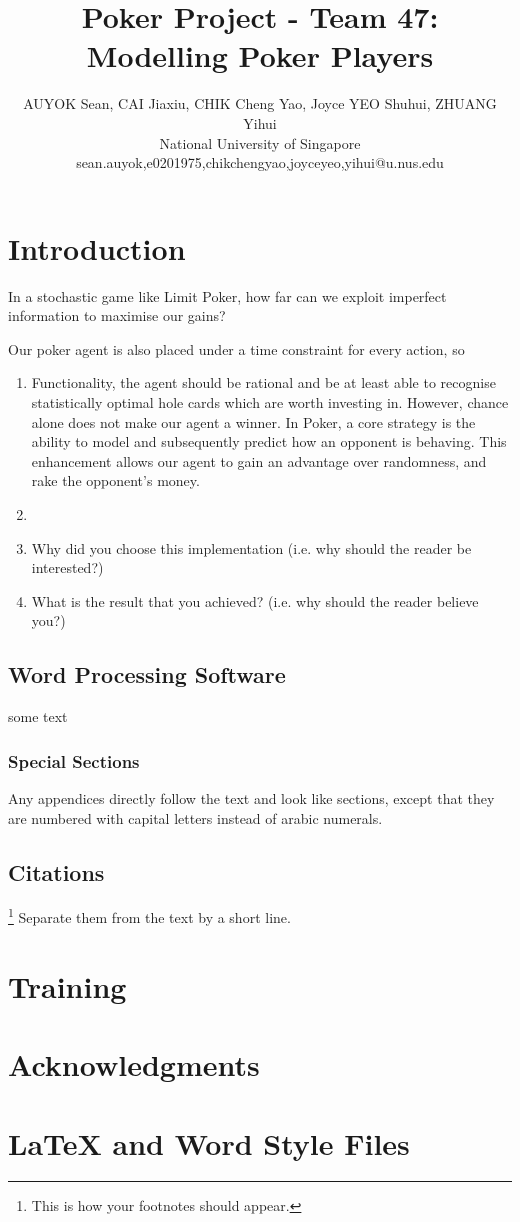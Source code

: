 \documentclass{article}
\title{Poker Project - Team 47: Modelling Poker Players}
\author{
AUYOK Sean, CAI Jiaxiu, CHIK Cheng Yao, Joyce YEO Shuhui, ZHUANG Yihui
\\ 
National University of Singapore\\
%
sean.auyok,e0201975,chikchengyao,joyceyeo,yihui@u.nus.edu
}
\begin{document}
\maketitle

\section{Introduction}

In a stochastic game like Limit Poker, how far can we exploit imperfect information to maximise our gains? 

Our poker agent is also placed under a time constraint for every action, so 

\begin{enumerate}
	\item Functionality, the agent should be rational and be at least able to recognise statistically optimal hole cards which are worth investing in. However, chance alone does not make our agent a winner. In Poker, a core strategy is the ability to model and subsequently predict how an opponent is behaving. This enhancement allows our agent to gain an advantage over randomness, and rake the opponent's money.
	\item
	\item Why did you choose this implementation (i.e. why should the reader be interested?)
	\item What is the result that you achieved? (i.e. why should the reader believe you?)
\end{enumerate}

\subsection{Word Processing Software}

some text



\subsubsection{Special Sections}

Any appendices directly follow the text and look like sections, except
that they are numbered with capital letters instead of arabic
numerals.

\subsection{Citations}

\footnote{This is how your footnotes should appear.} Separate them from the text by a short line.

\section{Training}

\section*{Acknowledgments}

\appendix

\section{\LaTeX{} and Word Style Files}\label{stylefiles}



\end{document}
